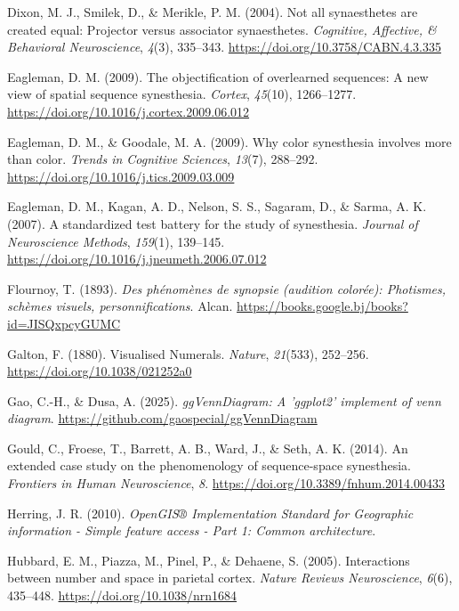 \documentclass[
  man,
  floatsintext,
  longtable,
  a4paper,
  nolmodern,
  notxfonts,
  notimes,
  colorlinks=true,linkcolor=blue,citecolor=blue,urlcolor=blue]{apa7}
\newlength{\cslhangindent}
\newenvironment{CSLReferences}[2] %
 {\begin{list}{}{%
  \setlength{\itemindent}{0pt}
  \setlength{\leftmargin}{0pt}
  \setlength{\parsep}{0pt}
  \ifodd #1
   \setlength{\leftmargin}{\cslhangindent}
   \setlength{\itemindent}{-1\cslhangindent}
  \fi
  \setlength{\itemsep}{#2\baselineskip}}}
 {\end{list}}
\begin{document}
\begin{CSLReferences}{1}{0}
Dixon, M. J., Smilek, D., \& Merikle, P. M. (2004). Not all synaesthetes
are created equal: Projector versus associator synaesthetes.
\emph{Cognitive, Affective, \& Behavioral Neuroscience}, \emph{4}(3),
335--343. \url{https://doi.org/10.3758/CABN.4.3.335}

Eagleman, D. M. (2009). The objectification of overlearned sequences: A
new view of spatial sequence synesthesia. \emph{Cortex}, \emph{45}(10),
1266--1277. \url{https://doi.org/10.1016/j.cortex.2009.06.012}

Eagleman, D. M., \& Goodale, M. A. (2009). Why color synesthesia
involves more than color. \emph{Trends in Cognitive Sciences},
\emph{13}(7), 288--292. \url{https://doi.org/10.1016/j.tics.2009.03.009}

Eagleman, D. M., Kagan, A. D., Nelson, S. S., Sagaram, D., \& Sarma, A.
K. (2007). A standardized test battery for the study of synesthesia.
\emph{Journal of Neuroscience Methods}, \emph{159}(1), 139--145.
\url{https://doi.org/10.1016/j.jneumeth.2006.07.012}

Flournoy, T. (1893). \emph{Des phénomènes de synopsie (audition
colorée): Photismes, schèmes visuels, personnifications}. Alcan.
\url{https://books.google.bj/books?id=JISQxpcyGUMC}

Galton, F. (1880). Visualised Numerals. \emph{Nature}, \emph{21}(533),
252--256. \url{https://doi.org/10.1038/021252a0}

Gao, C.-H., \& Dusa, A. (2025). \emph{{ggVennDiagram}: A 'ggplot2'
implement of venn diagram}.
\url{https://github.com/gaospecial/ggVennDiagram}

Gould, C., Froese, T., Barrett, A. B., Ward, J., \& Seth, A. K. (2014).
An extended case study on the phenomenology of sequence-space
synesthesia. \emph{Frontiers in Human Neuroscience}, \emph{8}.
\url{https://doi.org/10.3389/fnhum.2014.00433}

Herring, J. R. (2010). \emph{OpenGIS® Implementation Standard for
Geographic information - Simple feature access - Part 1: Common
architecture}.

Hubbard, E. M., Piazza, M., Pinel, P., \& Dehaene, S. (2005).
Interactions between number and space in parietal cortex. \emph{Nature
Reviews Neuroscience}, \emph{6}(6), 435--448.
\url{https://doi.org/10.1038/nrn1684}


\end{CSLReferences}
\end{document}
